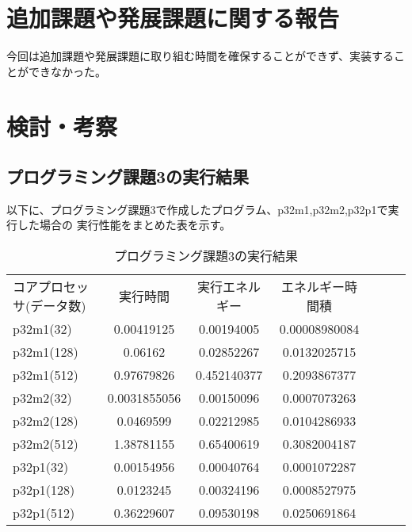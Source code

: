\documentclass{jarticle}[11pt]
\begin{document}
\section{追加課題や発展課題に関する報告}
\label{sec:追加課題や発展課題に関する報告}


今回は追加課題や発展課題に取り組む時間を確保することができず、実装することができなかった。



\section{検討・考察}
\label{sec:検討・考察}


\subsection{プログラミング課題3の実行結果}

以下に、プログラミング課題3で作成したプログラム、p32m1,p32m2,p32p1で実行した場合の
実行性能をまとめた表を示す。

\begin{table}[htb]

\caption{プログラミング課題3の実行結果}
\label{tab:プログラミング課題3の実行結果}
\begin{center}
\begin{tabular}{l|cccccc}
\hline
コアプロセッサ(データ数) 
& 実行時間 & 実行エネルギー & エネルギー時間積 \\
p32m1(32)     & 0.00419125 & 0.00194005 & 0.00008980084 \\
p32m1(128)     & 0.06162 & 0.02852267 & 0.0132025715 \\
p32m1(512)     & 0.97679826 & 0.452140377 & 0.2093867377 \\
p32m2(32)     & 0.0031855056 & 0.00150096 & 0.0007073263 \\
p32m2(128)     & 0.0469599 & 0.02212985 & 0.0104286933 \\
p32m2(512)     & 1.38781155 & 0.65400619 & 0.3082004187 \\
p32p1(32)     & 0.00154956 & 0.00040764 & 0.0001072287 \\
p32p1(128)     & 0.0123245 & 0.00324196 & 0.0008527975 \\
p32p1(512)     & 0.36229607 & 0.09530198 & 0.0250691864 \\
\hline
\end{tabular}
\end{center}
\end{table}
\end{document}

